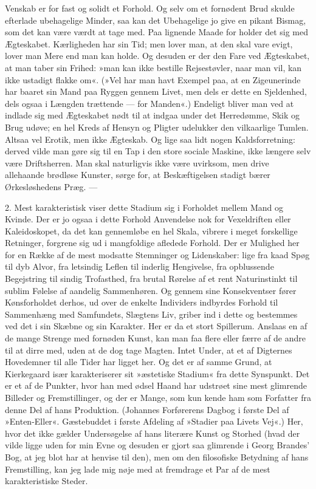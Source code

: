 \documentclass[12pt,a4paper,openany]{book}
\newcommand{\opage}[1]{\marginnote{\footnotesize\textit{[#1]}}}
\begin{document}
Venskab er for fast og solidt et Forhold. Og selv om
et fornødent Brud skulde efterlade ubehagelige Minder, saa
kan det Ubehagelige jo give en pikant Bismag, som det
kan være værdt at tage med. Paa lignende Maade for%
\opage{85}holder det sig med Ægteskabet. Kærligheden har sin
Tid; men lover man, at den skal vare evigt, lover man
Mere end man kan holde. Og desuden er der den Fare
ved Ægteskabet, at man taber sin Frihed: »man kan
ikke bestille Rejsestøvler, naar man vil, kan ikke ustadigt
flakke om«. (»Vel har man havt Exempel paa, at en
Zigeunerinde har baaret sin Mand paa Ryggen gennem
Livet, men dels er dette en Sjeldenhed, dels ogsaa i
Længden trættende --- for Manden«.) Endeligt bliver
man ved at indlade sig med Ægteskabet nødt til at indgaa
under det Herredømme, Skik og Brug udøve; en hel
Kreds af Hensyn og Pligter udelukker den vilkaarlige
Tumlen. Altsaa vel Erotik, men ikke Ægteskab. Og
lige saa lidt nogen Kaldsforretning: derved vilde man
gøre sig til en Tap i den store sociale Maskine, ikke
længere selv være Driftsherren. Man skal naturligvis
ikke være uvirksom, men drive allehaande brødløse
Kunster, sørge for, at Beskæftigelsen stadigt bærer
Ørkesløshedens Præg. ---

2. Mest karakteristisk viser dette Stadium sig i
Forholdet mellem Mand og Kvinde. Der er jo ogsaa i
dette Forhold Anvendelse nok for Vexeldriften eller
Kaleidoskopet, da det kan gennemløbe en hel Skala,
vibrere i meget forskellige Retninger, forgrene sig ud i
mangfoldige afledede Forhold. Der er Mulighed her for
en Række af de mest modsatte Stemninger og Lidenskaber:
lige fra kaad Spøg til dyb Alvor, fra letsindig
Leflen til inderlig Hengivelse, fra opblussende Begejstring
til sindig Trofasthed, fra brutal Rørelse af et rent Naturinstinkt
til sublim Følelse af aandelig Sammenhøren. Og
gennem sine Konsekventser fører Kønsforholdet derhos,
ud over de enkelte Individers indbyrdes Forhold til Sammenhæng
med Samfundets, Slægtens Liv, griber ind i
dette og bestemmes ved det i sin Skæbne og sin Karakter.
\opage{86}Her er da et stort Spillerum. Anslaas en af de mange
Strenge med fornøden Kunst, kan man faa flere eller
færre af de andre til at dirre med, uden at de dog tage
Magten. Intet Under, at et af Digternes Hovedemner
til alle Tider har ligget her. Og det er af samme Grund,
at Kierkegaard især karakteriserer sit »æstetiske Stadium«
fra dette Synspunkt. Det er et af de Punkter, hvor han
med ødsel Haand har udstrøet sine mest glimrende Billeder
og Fremstillinger, og der er Mange, som kun kende
ham som Forfatter fra denne Del af hans Produktion.
(Johannes Forførerens Dagbog i første Del af »Enten-Eller«.
Gæstebuddet i første Afdeling af »Stadier paa
Livets Vej«.) Her, hvor det ikke gælder Undersøgelse
af hans literære Kunst og Storhed (hvad der vilde ligge
uden for min Evne og desuden er gjort saa glimrende i
Georg Brandes' Bog, at jeg blot har at henvise til den),
men om den filosofiske Betydning af hans Fremstilling,
kan jeg lade mig nøje med at fremdrage et Par af de
mest karakteristiske Steder.
\end{document}
